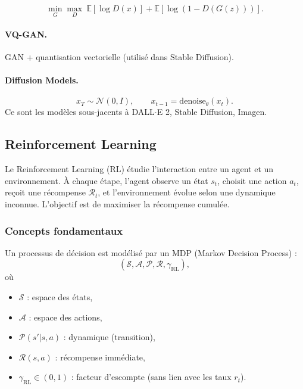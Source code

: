 \documentclass[11pt,a4paper]{article}
\newcommand{\1}{\mathbf{1}}
\begin{document}
\[
\min_G \max_D\
\mathbb{E}[\log D(x)] + \mathbb{E}[\log(1 - D(G(z)))].
\]

\paragraph{VQ-GAN.}
GAN + quantisation vectorielle (utilisé dans Stable Diffusion).

\paragraph{Diffusion Models.}

\[
x_T \sim \mathcal{N}(0,I),\qquad
x_{t-1} = \mathrm{denoise}_\theta(x_t).
\]
Ce sont les modèles sous-jacents à DALL$\cdot$E 2, Stable Diffusion, Imagen.



\subsection{Reinforcement Learning}

Le Reinforcement Learning (RL) étudie l'interaction entre un agent et un
environnement.
À chaque étape, l'agent observe un état $s_t$, choisit une action $a_t$, reçoit
une récompense $\mathcal{R}_t$, et l'environnement évolue selon une dynamique inconnue.
L'objectif est de maximiser la récompense cumulée.

\subsubsection{Concepts fondamentaux}

Un processus de décision est modélisé par un MDP
(Markov Decision Process) :
\[
(\mathcal{S},\mathcal{A},\mathcal{P},\mathcal{R},\gamma_{\mathrm{RL}}),
\]
où
\begin{itemize}
  \item $\mathcal{S}$ : espace des états,
  \item $\mathcal{A}$ : espace des actions,
  \item $\mathcal{P}(s'|s,a)$ : dynamique (transition),
  \item $\mathcal{R}(s,a)$ : récompense immédiate,
  \item $\gamma_{\mathrm{RL}} \in (0,1)$ : facteur d'escompte (sans lien avec les taux $r_t$).
\end{itemize}
\end{document}
